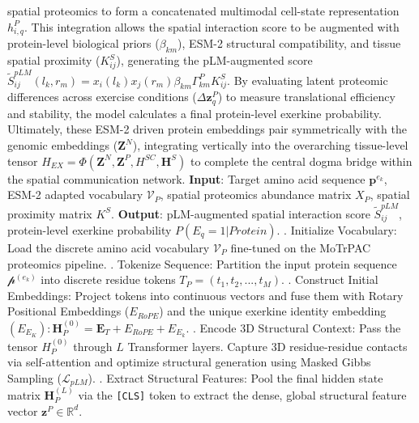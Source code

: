 \documentclass[11pt]{article}
\begin{document}
spatial proteomics to form a concatenated multimodal cell-state representation $h_{i,q}^P$. This integration allows the spatial interaction score to be augmented with protein-level biological priors ($\beta_{km}$), ESM-2 structural compatibility, and tissue spatial proximity ($K_{ij}^S$), generating the pLM-augmented score $\widetilde{S}_{ij}^{pLM}(l_k,r_m) = x_i(l_k)x_j(r_m)\beta_{km}\Gamma_{km}^PK_{ij}^S.$ By evaluating latent proteomic differences across exercise conditions ($\Delta\mathbf{z}_q^P$) to measure translational efficiency and stability, the model calculates a final protein-level exerkine probability. Ultimately, these ESM-2 driven protein embeddings pair symmetrically with the genomic embeddings ($\mathbf{Z}^N$), integrating vertically into the overarching tissue-level tensor $H_{EX} = \Phi(\mathbf{Z}^N,\mathbf{Z}^P,H^{SC},\mathbf{H}^S)$ to complete the central dogma bridge within the spatial communication network. \newline
{} \newline
\textbf{Input}: Target amino acid sequence $\mathbf{p}^{e_k}$, ESM-2 adapted vocabulary $\mathcal{V}_P$, spatial proteomics abundance matrix $X_P$, spatial proximity matrix $K^S$. \newline
\textbf{Output}: pLM-augmented spatial interaction score $\widetilde{S}_{ij}^{pLM}$, protein-level exerkine probability $P(E_q = 1 | Protein)$. . Initialize Vocabulary: Load the discrete amino acid vocabulary $\mathcal{V}_P$ fine-tuned on the MoTrPAC proteomics pipeline. . Tokenize Sequence: Partition the input protein sequence $\mathcal{p}^{(e_k)}$ into discrete residue tokens $T_P = (t_1, t_2, ..., t_M)$. . Construct Initial Embeddings: Project tokens into continuous vectors and fuse them with Rotary Positional Embeddings ($E_{RoPE}$) and the unique exerkine identity embedding $(E_{E_K}): \mathbf{H}_P^{(0)} = \mathbf{E}_T + E_{RoPE} + E_{E_k}.$ . Encode 3D Structural Context: Pass the tensor $H_P^{(0)}$ through $L$ Transformer layers. Capture 3D residue-residue contacts via self-attention and optimize structural generation using Masked Gibbs Sampling ($\mathcal{L}_{pLM}$). . Extract Structural Features: Pool the final hidden state matrix $\mathbf{H}_P^{(L)}$ via the \texttt{[CLS]} token to extract the dense, global structural feature vector $\mathbf{z}^P\in \mathbb{R}^d$. \newline
\end{document}
